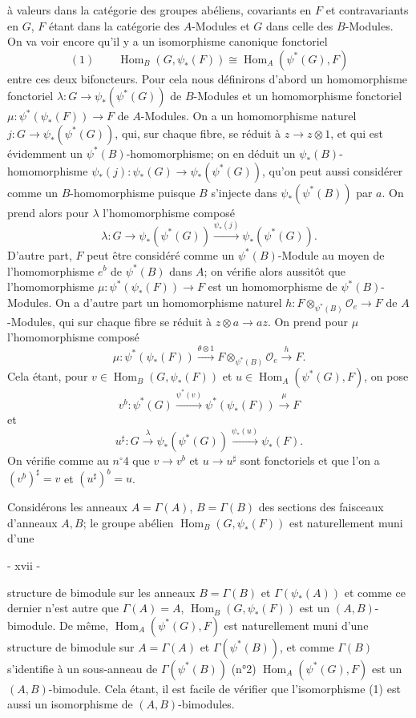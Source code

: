 à valeurs dans la catégorie des groupes abéliens, covariants en $F$ et contravariants en $G$, $F$ étant dans la catégorie des $A$-Modules et $G$ dans celle des $B$-Modules. On va voir encore qu'il y a un isomorphisme canonique fonctoriel
$$(1) \qquad \operatorname{Hom}_B(G, \psi_*(F)) \cong \operatorname{Hom}_A(\psi^*(G), F)$$
entre ces deux bifoncteurs. Pour cela nous définirons d'abord un homomorphisme fonctoriel $\lambda: G \to \psi_*(\psi^*(G))$ de $B$-Modules et un homomorphisme fonctoriel $\mu: \psi^*(\psi_*(F)) \to F$ de $A$-Modules. On a un homomorphisme naturel $j: G \to \psi_*(\psi^*(G))$, qui, sur chaque fibre, se réduit à $z \to z \otimes 1$, et qui est évidemment un $\psi^*(B)$-homomorphisme; on en déduit un $\psi_*(B)$-homomorphisme $\psi_*(j): \psi_*(G) \to \psi_*(\psi^*(G))$, qu'on peut aussi considérer comme un $B$-homomorphisme puisque $B$ s'injecte dans $\psi_*(\psi^*(B))$ par $a$. On prend alors pour $\lambda$ l'homomorphisme composé
$$\lambda: G \to \psi_*(\psi^*(G)) \xrightarrow{\psi_*(j)} \psi_*(\psi^*(G)).$$
D'autre part, $F$ peut être considéré comme un $\psi^*(B)$-Module au moyen de l'homomorphisme $e^b$ de $\psi^*(B)$ dans $A$; on vérifie alors aussitôt que l'homomorphisme $\mu: \psi^*(\psi_*(F)) \to F$ est un homomorphisme de $\psi^*(B)$-Modules. On a d'autre part un homomorphisme naturel $h: F \otimes_{\psi^*(B)} \mathcal{O}_e \to F$ de $A$-Modules, qui sur chaque fibre se réduit à $z \otimes a \to az$. On prend pour $\mu$ l'homomorphisme composé
$$\mu: \psi^*(\psi_*(F)) \xrightarrow{\theta \otimes 1} F \otimes_{\psi^*(B)} \mathcal{O}_e \xrightarrow{h} F.$$
Cela étant, pour $v \in \operatorname{Hom}_B(G, \psi_*(F))$ et $u \in \operatorname{Hom}_A(\psi^*(G), F)$, on pose
$$v^b: \psi^*(G) \xrightarrow{\psi^*(v)} \psi^*(\psi_*(F)) \xrightarrow{\mu} F$$
et
$$u^\sharp: G \xrightarrow{\lambda} \psi_*(\psi^*(G)) \xrightarrow{\psi_*(u)} \psi_*(F).$$
On vérifie comme au $n^\circ 4$ que $v \to v^b$ et $u \to u^\sharp$ sont fonctoriels et que l'on a $(v^b)^\sharp = v$ et $(u^\sharp)^b = u$.

Considérons les anneaux $A = \Gamma(A)$, $B = \Gamma(B)$ des sections des faisceaux d'anneaux $A, B$; le groupe abélien $\operatorname{Hom}_B(G, \psi_*(F))$ est naturellement muni d'une

\newpage


- xvii -

structure de bimodule sur les anneaux $B = \Gamma(B)$ et $\Gamma(\psi_*(A))$ et comme ce dernier n'est autre que $\Gamma(A) = A$, $\operatorname{Hom}_B(G, \psi_*(F))$ est un $(A,B)$-bimodule. De même, $\operatorname{Hom}_A(\psi^*(G), F)$ est naturellement muni d'une structure de bimodule sur $A = \Gamma(A)$ et $\Gamma(\psi^*(B))$, et comme $\Gamma(B)$ s'identifie à un sous-anneau de $\Gamma(\psi^*(B))$ (n°2) $\operatorname{Hom}_A(\psi^*(G), F)$ est un $(A,B)$-bimodule. Cela étant, il est facile de vérifier que l'isomorphisme (1) est aussi un isomorphisme de $(A,B)$-bimodules.

